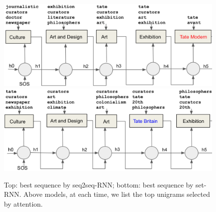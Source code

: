 %
\begin{figure}[t]
\includegraphics[width=1.0\columnwidth]{figs/train_sequence.png}
\includegraphics[width=1.0\columnwidth]{figs/train_set.png}

\caption{\fontsize{10}{12}\selectfont  Top: best sequence by seq2seq-RNN; bottom: best sequence by set-RNN. Above models, at each time, we list the top unigrams selected by attention.\vspace{2ex}}
\label{fig:models}
\end{figure}
